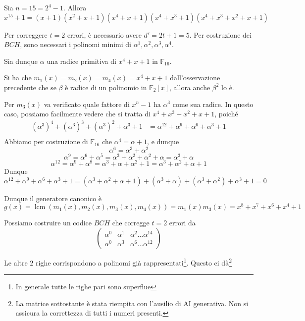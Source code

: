 \begin{example}{}
  Sia \(n = 15 = 2^4-1\). Allora
  \[x^{15}+1=(x+1)(x^2+x+1)(x^4+x+1)(x^4+x^3+1)(x^4+x^3+x^2+x+1)\]

  Per correggere \(t = 2\) errori, è necessario avere \(d' = 2t+1 = 5\).
  Per costruzione dei \(BCH\), sono necessari i polinomi minimi di \(\alpha^1, \alpha^2, \alpha^3, \alpha^4\).

  Sia dunque \(\alpha\) una radice primitiva di \(x^4+x+1\) in \(\mathbb{F}_{16}\).
  
  Si ha che \(m_1(x)= m_2(x) = m_4(x) = x^4+x+1\) dall'osservazione precedente che se \(\beta\) è radice di un polinomio in \(\mathbb{F}_2[x]\), allora anche \(\beta^2\) lo è.
  
  Per \(m_3(x)\) va verificato quale fattore di \(x^n-1\) ha \(\alpha^3\) come sua radice. In questo caso, possiamo facilmente vedere che si tratta di \(x^4+x^3+x^2+x+1\), poiché
  \[\begin{aligned}
    {(\alpha^3)}^4 + {(\alpha^3)}^3 + {(\alpha^3)}^2 + \alpha^3 + 1 &= \alpha^{12} + \alpha^9 + \alpha^6 + \alpha^3 + 1\\
  \end{aligned}\]
  Abbiamo per costruzione di \(\mathbb{F}_{16}\) che \(\alpha^4=\alpha + 1\), e dunque
  \[\alpha^6 = \alpha^3 + \alpha^2\]
  \[\alpha^9 = \alpha^6 + \alpha^5 = \alpha^3 + \alpha^2 + \alpha^2 + \alpha = \alpha^3 + \alpha\]
  \[\alpha^{12} = \alpha^9 + \alpha^8 = \alpha^3 + \alpha + \alpha^2 + 1 = \alpha^3 + \alpha^2 + \alpha + 1\]
  Dunque
  \[\alpha^{12} + \alpha^9 + \alpha^6 + \alpha^3 + 1 = (\alpha^3 + \alpha^2 + \alpha + 1) + (\alpha^3 + \alpha ) + (\alpha^3 + \alpha^2) + \alpha^3 + 1 = 0\]

  Dunque il generatore canonico è
  \[g(x) = \operatorname{lcm}(m_1(x), m_2(x), m_3(x), m_4(x)) = m_1(x)m_3(x) = x^8 + x^7 + x^6 + x^4 + 1\]

  Possiamo costruire un codice \(BCH\) che corregge \(t=2\) errori da
  \[\begin{pmatrix}
    \alpha^0 & \alpha^1 & \alpha^2 \ldots \alpha^{14}\\
    \alpha^0 & \alpha^3 & \alpha^6 \ldots \alpha^{12}
  \end{pmatrix}\]

  Le altre \(2\) righe corrispondono a polinomi già rappresentati\footnote{In generale tutte le righe pari sono superflue}. Questo ci dà\footnote{
    La matrice sottostante è stata riempita con l'ausilio di AI generativa. Non si assicura la correttezza di tutti i numeri presenti.
  }


\end{example}
